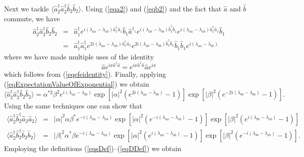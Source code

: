 \documentclass{iopart}
\begin{document}
Next we tackle $\langle \hat{a}^{\dagger}_2 \hat{a}^{\dagger}_2 \hat{b}_2 \hat{b}_2 \rangle$. Using (\ref{eqa2}) and (\ref{eqb2}) and the fact that $\hat{a}$ and $\hat{b}$ commute, we have
\begin{eqnarray}
\hat{a}^{\dagger}_2 \hat{a}^{\dagger}_2 \hat{b}_2 \hat{b}_2 &=& \hat{a}^{\dagger}_1 
  e^{i (\lambda_{aa}-\lambda_{ab}) \hat{a}^{\dagger}_1 \hat{a}_1}
  \hat{b}_1 \hat{a}^{\dagger_1}
  e^{i (\lambda_{ab}-\lambda_{bb}) \hat{b}^{\dagger}_1 \hat{b}_1}
  e^{i (\lambda_{aa}-\lambda_{ab}) \hat{a}^{\dagger}_1 \hat{a}_1}
  \hat{b}_1 \\
%
&=& \hat{a}^{\dagger}_1 \hat{a}^{\dagger}_1 
    e^{2i (\lambda_{aa}-\lambda_{ab}) \hat{a}^{\dagger}_1 \hat{a}_1}
    e^{2i (\lambda_{ab}-\lambda_{bb}) \hat{b}^{\dagger}_1 \hat{b}_1}
    \hat{b}_1 \hat{b}_1 e^{i(\lambda_{aa}-\lambda_{bb})}
\end{eqnarray}
where we have made multiple uses of the identity 
\begin{equation}
\hat{a} e^{i x \hat{a}^{\dagger} \hat{a}} = e^{i x \hat{a}^{\dagger} \hat{a}} \hat{a} e^{ix}
\end{equation}
which follows from (\ref{eqefeidentity}). Finally, applying (\ref{eqExpectationValueOfExponential}) we obtain
\begin{equation}
\langle \hat{a}^{\dagger}_2 \hat{a}^{\dagger}_2 \hat{b}_2 \hat{b}_2 \rangle = \alpha^{*2} \beta^2 e^{i(\lambda_{aa}-\lambda_{bb})} \exp[|\alpha|^2(e^{2i (\lambda_{aa} - \lambda_{bb})} -1)] \exp[|\beta|^2(e^{-2i (\lambda_{bb} - \lambda_{bb})} -1)].
\end{equation}
Using the same techniques one can show that
\begin{eqnarray}
\langle \hat{a}^{\dagger}_2 \hat{b}^{\dagger}_2 \hat{a}_2 \hat{a}_2 \rangle &=& |\alpha|^2 \alpha \beta^* e^{-i(\lambda_{aa}-\lambda_{ab})} \exp[|\alpha|^2(e^{-i (\lambda_{aa} - \lambda_{ab})} -1)] \exp[|\beta|^2(e^{i (\lambda_{bb} - \lambda_{ab})} -1)] \\
%
\langle \hat{a}^{\dagger}_2 \hat{b}^{\dagger}_2 \hat{b}_2 \hat{b}_2 \rangle &=& |\beta|^2 \alpha^{*} \beta e^{-i(\lambda_{bb}-\lambda_{ab})} \exp[|\alpha|^2(e^{i (\lambda_{aa} - \lambda_{ab})} -1)] \exp[|\beta|^2(e^{-i (\lambda_{bb} - \lambda_{ab})} -1)].
\end{eqnarray}
Employing the definitions (\ref{eqsDef})--(\ref{eqDDef}) we obtain
\end{document}
